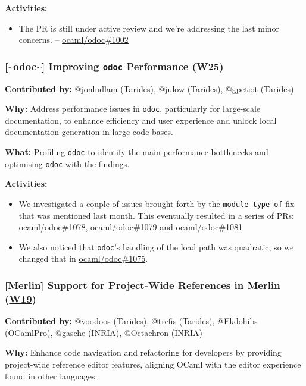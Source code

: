 \documentclass[11pt]{article}
\begin{document}
\textbf{Activities:}
\begin{itemize}
\item The PR is still under active review and we're addressing the last minor concerns. -- \href{https://github.com/ocaml/odoc/pull/1002}{ocaml/odoc\#1002}
\end{itemize}
\subsubsection*{\textbf{{[}\textasciitilde{}odoc\textasciitilde{}]} Improving \texttt{odoc} Performance (\href{https://ocaml.org/docs/platform-roadmap\#w25-generate-documentation}{W25})}
\label{sec:org94b254b}

\textbf{Contributed by:} @jonludlam (Tarides), @julow (Tarides), @gpetiot (Tarides)

\textbf{Why:} Address performance issues in \texttt{odoc}, particularly for large-scale documentation, to enhance efficiency and user experience
and unlock local documentation generation in large code bases.

\textbf{What:} Profiling \texttt{odoc} to identify the main performance bottlenecks and optimising \texttt{odoc} with the findings.

\textbf{Activities:}
\begin{itemize}
\item We investigated a couple of issues brought forth by the \texttt{module type of} fix that was mentioned last month. This eventually resulted in a series of PRs: \href{https://github.com/ocaml/odoc/pull/1078}{ocaml/odoc\#1078}, \href{https://github.com/ocaml/odoc/pull/1079}{ocaml/odoc\#1079} and \href{https://github.com/ocaml/odoc/pull/1081}{ocaml/odoc\#1081}
\item We also noticed that \texttt{odoc}'s handling of the load path was quadratic, so we changed that in \href{https://github.com/ocaml/odoc/pull/1075}{ocaml/odoc\#1075}.
\end{itemize}
\subsubsection*{\textbf{{[}Merlin]} Support for Project-Wide References in Merlin (\href{https://ocaml.org/docs/platform-roadmap\#w19-navigate-code}{W19})}
\label{sec:org3b37b55}

\textbf{Contributed by:} @voodoos (Tarides), @trefis (Tarides), @Ekdohibs (OCamlPro), @gasche (INRIA), @Octachron (INRIA)

\textbf{Why:} Enhance code navigation and refactoring for developers by providing project-wide reference editor features, aligning OCaml
with the editor experience found in other languages.
\end{document}
